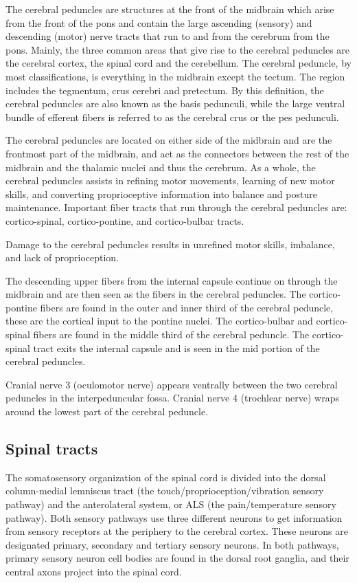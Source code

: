 \documentclass[]{book}
\begin{document}
The cerebral peduncles are structures at the front of the midbrain which arise from the front of the pons and contain the large ascending (sensory) and descending (motor) nerve tracts that run to and from the cerebrum from the pons. Mainly, the three common areas that give rise to the cerebral peduncles are the cerebral cortex, the spinal cord and the cerebellum. The cerebral peduncle, by most classifications, is everything in the midbrain except the tectum. The region includes the tegmentum, crus cerebri and pretectum. By this definition, the cerebral peduncles are also known as the basis pedunculi, while the large ventral bundle of efferent fibers is referred to as the cerebral crus or the pes pedunculi.

The cerebral peduncles are located on either side of the midbrain and are the frontmost part of the midbrain, and act as the connectors between the rest of the midbrain and the thalamic nuclei and thus the cerebrum. As a whole, the cerebral peduncles assists in refining motor movements, learning of new motor skills, and converting proprioceptive information into balance and posture maintenance. Important fiber tracts that run through the cerebral peduncles are: cortico-spinal, cortico-pontine, and cortico-bulbar tracts.

Damage to the cerebral peduncles results in unrefined motor skills, imbalance, and lack of proprioception.

The descending upper fibers from the internal capsule continue on through the midbrain and are then seen as the fibers in the cerebral peduncles. The cortico-pontine fibers are found in the outer and inner third of the cerebral peduncle, these are the cortical input to the pontine nuclei. The cortico-bulbar and cortico-spinal fibers are found in the middle third of the cerebral peduncle. The cortico-spinal tract exits the internal capsule and is seen in the mid portion of the cerebral peduncles.

Cranial nerve 3 (oculomotor nerve) appears ventrally between the two cerebral peduncles in the interpeduncular fossa. Cranial nerve 4 (trochlear nerve) wraps around the lowest part of the cerebral peduncle.

\hypertarget{spinal-tracts}{%
\subsection{Spinal tracts}\label{spinal-tracts}}

The somatosensory organization of the spinal cord is divided into the dorsal column-medial lemniscus tract (the touch/proprioception/vibration sensory pathway) and the anterolateral system, or ALS (the pain/temperature sensory pathway). Both sensory pathways use three different neurons to get information from sensory receptors at the periphery to the cerebral cortex. These neurons are designated primary, secondary and tertiary sensory neurons. In both pathways, primary sensory neuron cell bodies are found in the dorsal root ganglia, and their central axons project into the spinal cord.
\end{document}
